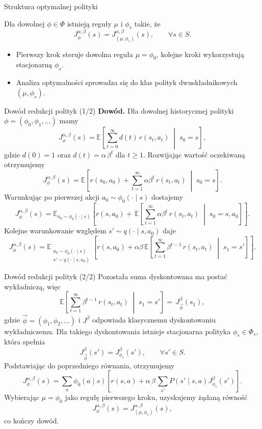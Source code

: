 \begin{frame}{Struktura optymalnej polityki}
  \begin{theorem}
    Dla dowolnej $\phi \in \Phi$ istnieją reguły $\mu$ i $\phi_s$ takie, że
    \[
      J_{\phi}^{\alpha,\beta}(s) = J_{(\mu,\phi_s)}^{\alpha,\beta}(s), \qquad \forall s \in S.
    \]
  \end{theorem}
  \begin{itemize}
    \item Pierwszy krok steruje dowolna reguła $\mu = \phi_0$, kolejne kroki wykorzystują stacjonarną $\phi_s$.
    \item Analiza optymalności sprowadza się do klas polityk dwuskładnikowych $(\mu,\phi_s)$.
  \end{itemize}
\end{frame}

\begin{frame}{Dowód redukcji polityk (1/2)}
  \small
    \textbf{Dowód.}\; Dla dowolnej historycznej polityki $\phi = (\phi_0, \phi_1, \ldots)$ mamy
  \[
    J_{\phi}^{\alpha,\beta}(s) = \mathbb{E}\!\left[ \sum_{t=0}^{\infty} d(t)\, r(s_t, a_t) \;\middle|\; s_0 = s \right],
  \]
  gdzie $d(0) = 1$ oraz $d(t) = \alpha\,\beta^{t}$ dla $t \ge 1$.
  Rozwijając wartość oczekiwaną otrzymujemy
  \[
    J_{\phi}^{\alpha,\beta}(s) = \mathbb{E}\!\left[ r(s_0,a_0) + \sum_{t=1}^{\infty} \alpha \beta^{t}\, r(s_t,a_t) \;\middle|\; s_0 = s \right].
  \]
  Warunkując po pierwszej akcji $a_0 \sim \phi_0(\cdot \mid s)$ dostajemy
  \[
    J_{\phi}^{\alpha,\beta}(s) = \mathbb{E}_{a_0 \sim \phi_0(\cdot \mid s)}\!\left[ r(s,a_0) + \,\mathbb{E}\!\left[ \sum_{t=1}^{\infty} \alpha \beta^{t}\, r(s_t,a_t) \;\middle|\; s_0 = s, a_0 \right] \right].
  \]
  Kolejne warunkowanie względem $s' \sim q(\cdot \mid s,a_0)$ daje
  \[
    J_{\phi}^{\alpha,\beta}(s) = \mathbb{E}_{\substack{a_0 \sim \phi_0(\cdot \mid s) \\ s' \sim q(\cdot \mid s,a_0)}}\!\left[ r(s,a_0) + \alpha\beta\,\mathbb{E}\!\left[ \sum_{t=1}^{\infty} \beta^{t-1}\, r(s_t,a_t) \;\middle|\; s_1=s' \right] \right].
  \]
\end{frame}

\begin{frame}{Dowód redukcji polityk (2/2)}
  \small
  Pozostała suma dyskontowana ma postać wykładniczą, więc
  \[
    \mathbb{E}\!\left[ \sum_{t=1}^{\infty} \beta^{t-1}\, r(s_t,a_t) \;\middle|\; s_1 = s' \right] = \,J_{\overrightarrow{\phi}}^{\beta}(s_1),
  \]
  gdzie $\overrightarrow{\phi} = (\phi_1, \phi_2, \ldots)$ i $J^{\beta}$ odpowiada klasycznemu dyskontowaniu wykładniczemu.
  Dla takiego dyskontowania istnieje stacjonarna polityka $\phi_s \in \Phi_s$, która spełnia
  \[
    J^{\beta}_{\overrightarrow{\phi}}(s') = J^{\beta}_{\phi_s}(s'), \qquad \forall s' \in S.
  \]
  Podstawiając do poprzedniego równania, otrzymujemy
  \[
    J_{\phi}^{\alpha,\beta}(s) = \sum_{a}\phi_{0}(a \mid s)\!\left[ r(s,a) + \alpha\,\beta\, \sum_{s'} P(s' \mid s,a) J^{\beta}_{\phi_s}(s') \right].
  \]
  Wybierając $\mu = \phi_0$ jako regułę pierwszego kroku, uzyskujemy żądaną równość
  \[
    J_{\phi}^{\alpha,\beta}(s) = J_{(\mu,\phi_s)}^{\alpha,\beta}(s), 
  \]
  co kończy dowód.
\end{frame}

